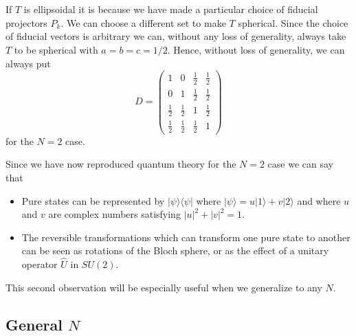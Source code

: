 \documentclass[10pt,twocolumn]{article}
\begin{document}
If $T$ is ellipsoidal it is because we have made a
particular choice of fiducial projectors $\hat{P}_k$.  We can choose a
different set to make $T$ spherical.  Since the choice of fiducial
vectors is arbitrary we can, without any loss of generality, always
take $T$ to be spherical with $a=b=c=1/2$.  Hence, without loss of
generality, we can always put
\begin{equation}\label{Dhalfs}
D= \left( \begin{array}{cccc} 1 &  0 &  \frac{1}{2} & \frac{1}{2}\\[3pt]
                             0 &  1 &   \frac{1}{2}  &  \frac{1}{2} \\[3pt]
                             \frac{1}{2} & \frac{1}{2} &  1 & \frac{1}{2}\\[3pt]
                            \frac{1}{2} & \frac{1}{2} & \frac{1}{2} &  1
                            \end{array} \right)
\end{equation}
for the $N=2$ case.

Since we have now reproduced quantum theory for the $N=2$ case we can
say that
\begin{itemize}
\item Pure states can be represented by $|\psi\rangle\langle\psi |$
where $|\psi\rangle= u|1\rangle+v|2\rangle$ and where $u$ and $v$ are
complex numbers satisfying $|u|^2+|v|^2=1$.
\item The reversible transformations which can transform one pure state
to another can be seen as rotations of the Bloch sphere, or as the
effect of a unitary operator $\hat U$ in $SU(2)$.
\end{itemize}
This second observation will be especially useful when we generalize to
any $N$.

\subsection{General $N$}
\end{document}
